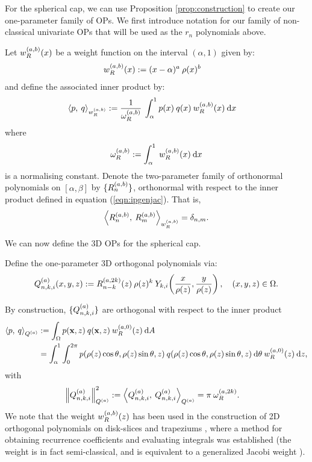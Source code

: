 \documentclass[11pt, oneside]{article}   	%
\begin{document}
For the spherical cap, we can use Proposition \ref{prop:construction} to create our one-parameter family of OPs. We first introduce notation for our family of non-classical univariate OPs that will be used as the $r_n$ polynomials above.
\begin{definition}\label{def:OPconstruction}
	Let $w_R^{(a,b)}(x)$ be a weight function on the interval $(\alpha, 1)$ given by:
\begin{align*}
	w_R^{(a,b)}(x) &:= (x - \alpha)^{a} \: \rho(x)^{b}
\end{align*}
and define the associated inner product by:
\begin{align}
	\ip< p, \: q >_{\genjacw^{(a,b)}} &:= \frac{1}{\normgenjac^{(a,b)}} \: \int_\alpha^1 p(x) \: q(x) \: \genjacw^{(a,b)}(x) \: \D x \label{eqn:ipgenjac}
\end{align}
where
\begin{align}
	\omega_R^{(a,b)} := \int_\alpha^1 \: w_R^{(a,b)}(x) \: {\rm d} x \label{eqn:ipnormalisation}
\end{align}
is a normalising constant.
Denote the two-parameter family of orthonormal polynomials on $[\alpha,\beta]$ by $\{R_n^{(a,b)}\}$, orthonormal with respect to the inner product defined in equation (\ref{eqn:ipgenjac}). That is,
\begin{align}
	\ip< \genjac_n^{(a,b)}, \: \genjac_m^{(a,b)} >_{\genjacw^{(a,b)}} = \delta_{n,m}.
\end{align}
\end{definition}

We can now define the 3D OPs for the spherical cap.
\begin{definition}\label{def:constuction}
	Define the one-parameter 3D orthogonal polynomials via:
\begin{align}
	\scopnkia(x,y,z) := \genjacnmk^{(a,2k)}(z) \: \rho(z)^k \: \chki\fpr(\frac{x}{\rho(z)}, \frac{y}{\rho(z)}), \quad (x,y,z) \in \Omega.
\end{align}
\end{definition}

By construction, $\{Q_{n,k,i}^{(a)}\}$ are orthogonal with respect to the inner product
\begin{align*}
	\ip< p, \: q >_{\scopa} &:= \int_\Omega p(\xvec, z) \: q(\xvec, z) \: \genjacw^{(a,0)}(z) \: \D A \\
	&= \int_\alpha^1 \int_0^{2\pi} p(\rho(z) \cos\theta, \rho(z) \sin\theta, z) \: q(\rho(z) \cos\theta, \rho(z) \sin\theta, z) \: \D \theta \: \genjacw^{(a,0)}(z) \: \D z,
\end{align*}
with
\begin{align}
	\norm{\scopnkia}_{\scopa}^2 &:= \ip< \scopnkia, \: \scopnkia >_{\scopa} = \pi \: \normgenjac^{(a, 2k)}. \label{eqn:normscop}
\end{align}
We note that the weight $w_R^{(a,b)}(z)$ has been used in the construction of 2D orthogonal polynomials on disk-slices and trapeziums \cite{snowball2019sparse}, where a method for obtaining recurrence coefficients and evaluating integrals was established (the weight is in fact semi-classical, and is equivalent to a generalized Jacobi weight \cite[\S5]{magnus1995painleve}). 
\end{document}
